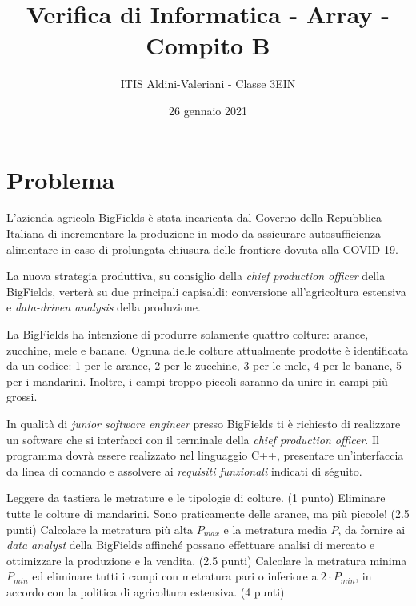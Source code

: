 \documentclass[a4paper, 11pt]{exam}
\title{Verifica di Informatica - Array - Compito B}
\author{ITIS Aldini-Valeriani - Classe 3EIN}
\date{26 gennaio 2021}
\begin{document}
\maketitle
\begin{center}

\end{center}
\vspace{1em}

\section*{Problema}

L'azienda agricola BigFields è stata incaricata dal Governo della Repubblica Italiana di incrementare la produzione in modo da assicurare autosufficienza alimentare in caso di prolungata chiusura delle frontiere dovuta alla COVID-19.

La nuova strategia produttiva, su consiglio della \textit{chief production officer} della BigFields, verterà su due principali capisaldi: conversione all'agricoltura estensiva e \textit{data-driven analysis} della produzione.

La BigFields ha intenzione di produrre solamente quattro colture: arance, zucchine, mele e banane.
Ognuna delle colture attualmente prodotte è identificata da un codice: 1 per le arance, 2 per le zucchine, 3 per le mele, 4 per le banane, 5 per i mandarini. 
Inoltre, i campi troppo piccoli saranno da unire in campi più grossi.

In qualità di \textit{junior software engineer} presso BigFields ti è richiesto di realizzare un software che si interfacci con il terminale della \textit{chief production officer}.
Il programma dovrà essere realizzato nel linguaggio C++, presentare un'interfaccia da linea di comando e assolvere ai \textit{requisiti funzionali} indicati di séguito.

\begin{questions}
	\question Leggere da tastiera le metrature e le tipologie di colture. (1 punto)
	\question Eliminare tutte le colture di mandarini. Sono praticamente delle arance, ma più piccole! (2.5 punti)
	\question Calcolare la metratura più alta $P_{max}$ e la metratura media $\bar{P}$, da fornire ai \textit{data analyst} della BigFields affinché possano effettuare analisi di mercato e ottimizzare la produzione e la vendita.  (2.5 punti)
	\question Calcolare la metratura  minima $P_{min}$ ed eliminare tutti i campi con metratura  pari o inferiore a $2 \cdot P_{min}$, in accordo con la politica di agricoltura estensiva. (4 punti)
\end{questions}
\end{document}
